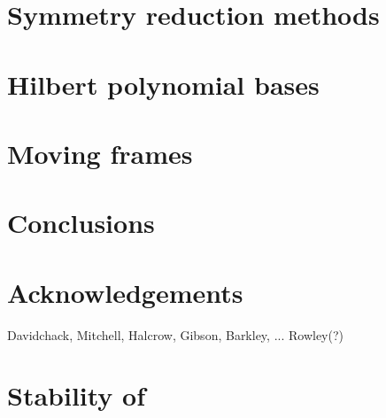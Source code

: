 \documentclass[aps,prl,preprint,superscriptaddress]{revtex4}
\begin{document}
\subsection{\label{s:introCLE} \CLe}
    

\section{\label{s:symRedGeneral} Symmetry reduction methods}
    

\section{\label{s:Hilbert} Hilbert polynomial bases}
    

\section{\label{sec:mf} Moving frames}
    
    
    
    


\section{Conclusions}
    

\section*{Acknowledgements}
 Davidchack, Mitchell, Halcrow, Gibson, Barkley, ... Rowley(?)


\appendix

\section{\label{s:StabReq} Stability of \reqva}
    






    
    
\end{document}
